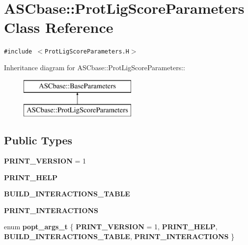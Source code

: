 \section{ASCbase::Prot\-Lig\-Score\-Parameters Class Reference}
\label{classASCbase_1_1ProtLigScoreParameters}
{\tt \#include $<$Prot\-Lig\-Score\-Parameters.H$>$}

Inheritance diagram for ASCbase::Prot\-Lig\-Score\-Parameters::\begin{figure}[H]
\begin{center}
\leavevmode
\includegraphics[height=2cm]{classASCbase_1_1ProtLigScoreParameters}
\end{center}
\end{figure}
\subsection*{Public Types}
\begin{CompactItemize}
\item 
\textbf{PRINT\_\-VERSION} = 1\label{classASCbase_1_1ProtLigScoreParameters_b7a9a2b023394c378461bd68df038bd29305d63d54f96f7ee778ef05392a7dab}

\item 
\textbf{PRINT\_\-HELP}\label{classASCbase_1_1ProtLigScoreParameters_b7a9a2b023394c378461bd68df038bd21075878cd4751c0b277fd4bc7d447435}

\item 
\textbf{BUILD\_\-INTERACTIONS\_\-TABLE}\label{classASCbase_1_1ProtLigScoreParameters_b7a9a2b023394c378461bd68df038bd291556765acaf9b14a740324aa7f42dcc}

\item 
\textbf{PRINT\_\-INTERACTIONS}\label{classASCbase_1_1ProtLigScoreParameters_b7a9a2b023394c378461bd68df038bd2fe1c72651287d18338539baf44f75cc8}

\item 
enum \textbf{popt\_\-args\_\-t} \{ \textbf{PRINT\_\-VERSION} =  1, 
\textbf{PRINT\_\-HELP}, 
\textbf{BUILD\_\-INTERACTIONS\_\-TABLE}, 
\textbf{PRINT\_\-INTERACTIONS}
 \}
\end{CompactItemize}
